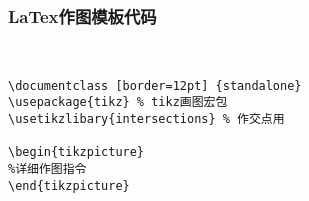 \begin{frame}[fragile]
\frametitle{LaTex作图模板代码}
\fontsize{28}{32}\\
\vspace{12pt}

\begin{verbatim}
\documentclass [border=12pt] {standalone}
\usepackage{tikz} % tikz画图宏包
\usetikzlibary{intersections} % 作交点用

\begin{tikzpicture}
%详细作图指令
\end{tikzpicture}

\end{verbatim}

\end{frame}
